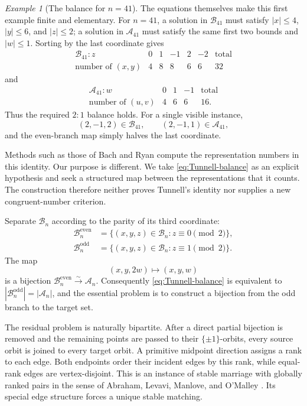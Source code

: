 \documentclass[11pt]{amsart}
\theoremstyle{definition}
\theoremstyle{remark}
\newtheorem{example}[theorem]{Example}
\newcommand{\Bn}{\mathcal B_n}
\newcommand{\An}{\mathcal A_n}
\newcommand{\Bodd}{\mathcal B_n^{\mathrm{odd}}}
\newcommand{\Beven}{\mathcal B_n^{\mathrm{even}}}
\begin{document}
\begin{example}[The balance for $n=41$]\label{ex:balance-41}
The equations themselves make this first example finite and elementary.  For
$n=41$, a solution in $\mathcal B_{41}$ must satisfy
$|x|\le4$, $|y|\le6$, and $|z|\le2$; a solution in $\mathcal A_{41}$ must
satisfy the same first two bounds and $|w|\le1$.  Sorting by the last
coordinate gives
\[
\begin{array}{c|ccccc|c}
\mathcal B_{41}:z&0&1&-1&2&-2&\text{total}\\ \hline
\text{number of }(x,y)&4&8&8&6&6&32
\end{array}
\]
and
\[
\begin{array}{c|ccc|c}
\mathcal A_{41}:w&0&1&-1&\text{total}\\ \hline
\text{number of }(u,v)&4&6&6&16.
\end{array}
\]
Thus the required $2{:}1$ balance holds.  For a single visible instance,
\[
 (2,-1,2)\in\mathcal B_{41},
 \qquad
 (2,-1,1)\in\mathcal A_{41},
\]
and the even-branch map simply halves the last coordinate.
\end{example}

Methods such as those of Bach and Ryan \cite{BachRyan} compute the
representation numbers in this identity.  Our purpose is different.  We take
\eqref{eq:Tunnell-balance} as an explicit hypothesis and seek a structured
map between the representations that it counts.  The construction therefore
neither proves Tunnell's identity nor supplies a new congruent-number
criterion.

Separate $\Bn$ according to the parity of its third coordinate:
\begin{align*}
 \Beven&=\{(x,y,z)\in\Bn:z\equiv0\pmod2\},\\
 \Bodd&=\{(x,y,z)\in\Bn:z\equiv1\pmod2\}.
\end{align*}
The map
\begin{equation}\label{eq:even-branch}
 (x,y,2w)\longmapsto(x,y,w)
\end{equation}
is a bijection $\Beven\xrightarrow{\sim}\An$.  Consequently
\eqref{eq:Tunnell-balance} is equivalent to $|\Bodd|=|\An|$, and the
essential problem is to construct a bijection from the odd branch to the
target set.

The residual problem is naturally bipartite.  After a direct partial
bijection is removed and the remaining points are passed to their
$\{\pm1\}$-orbits, every source orbit is joined to every target orbit.  A
primitive midpoint direction assigns a rank to each edge.  Both endpoints
order their incident edges by this rank, while equal-rank edges are
vertex-disjoint.  This is an instance of stable marriage with globally ranked
pairs in the sense of Abraham, Levavi, Manlove, and O'Malley
\cite{AbrahamEtAl}.  Its special edge structure forces a unique stable
matching.
\end{document}
